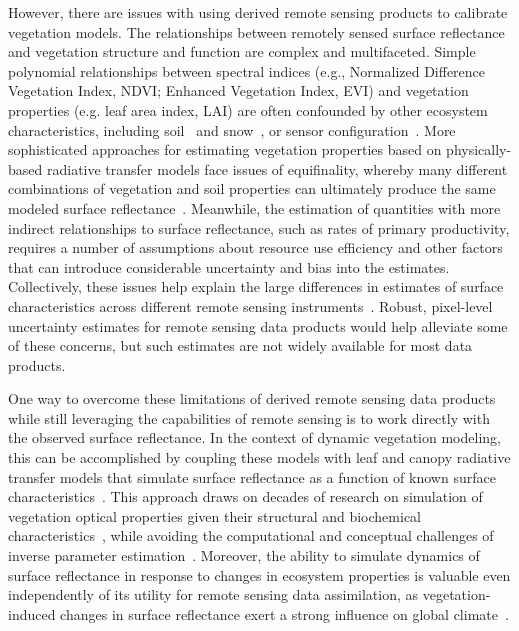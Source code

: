 However, there are issues with using derived remote sensing products to calibrate vegetation models.
The relationships between remotely sensed surface reflectance and vegetation structure and function are complex and multifaceted.
Simple polynomial relationships between spectral indices (e.g., Normalized Difference Vegetation Index, NDVI; Enhanced Vegetation Index, EVI) and vegetation properties (e.g. leaf area index, LAI) are often confounded by other ecosystem characteristics, including soil~\parencite{myneni1994relationship} and snow~\parencite{zhang2020evaluating}, or sensor configuration~\parencite{fensholt2004evaluation}.
More sophisticated approaches for estimating vegetation properties based on physically-based radiative transfer models face issues of equifinality, whereby many different combinations of vegetation and soil properties can ultimately produce the same modeled surface reflectance~\parencite{combal2003retrieval, lewis2007spectral}.
Meanwhile, the estimation of quantities with more indirect relationships to surface reflectance, such as rates of primary productivity, requires a number of assumptions about resource use efficiency and other factors~\parencite{running2004continuous} that can introduce considerable uncertainty and bias into the estimates.
Collectively, these issues help explain the large differences in estimates of surface characteristics across different remote sensing instruments~\parencite{liu_2018_satellite}.
Robust, pixel-level uncertainty estimates for remote sensing data products would help alleviate some of these concerns, but such estimates are not widely available for most data products.

One way to overcome these limitations of derived remote sensing data products while still leveraging the capabilities of remote sensing is to work directly with the observed surface reflectance.
In the context of dynamic vegetation modeling, this can be accomplished by coupling these models with leaf and canopy radiative transfer models that simulate surface reflectance as a function of known surface characteristics~\parencite{knorr2001assimilation, nouvellon2001coupling, quaife2008assimilating}.
This approach draws on decades of research on simulation of vegetation optical properties given their structural and biochemical characteristics~\parencite{dickinson_1983_land, sellers1985canopy, verhoef1984light, lewis2007spectral, jacquemoud2009prospect, pinty2004synergy, widlowski2007third, widlowski2015fourth, hogan_2018_fast}, while avoiding the computational and conceptual challenges of inverse parameter estimation~\parencite{combal2003retrieval, lewis2007spectral}.
Moreover, the ability to simulate dynamics of surface reflectance in response to changes in ecosystem properties is valuable even independently of its utility for remote sensing data assimilation, as vegetation-induced changes in surface reflectance exert a strong influence on global climate~\parencite{bonan2008forests, swann2010changes, swann2012midlatitude}.

